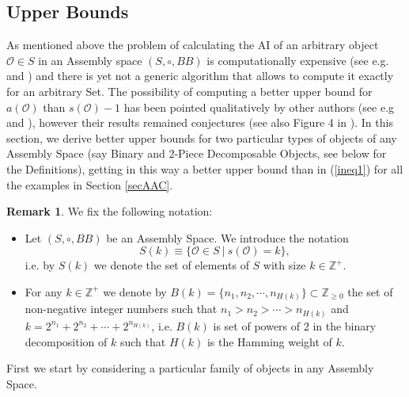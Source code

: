 \documentclass[letterpaper,12pt]{article}
\theoremstyle{definition}
\newtheorem{remark}{Remark}
\begin{document}



\subsection{Upper Bounds}

As mentioned above the problem of calculating the AI  of an arbitrary object $\mathscr{O} \in S$ in an Assembly space $(S,\circ,BB)$ is computationally expensive (see e.g. \cite{kempes2024assembly} and \cite{seet2024rapid}) and there is yet not a generic algorithm that allows to compute it exactly for an arbitrary Set. The possibility of computing a better upper bound for $a(\mathscr{O})$ than $s(\mathscr{O})-1$ has been pointed qualitatively by other authors (see e.g \cite{Marshall2022FormalisingTP} and \cite{math12101600}), however their results remained conjectures (see also Figure 4 in \cite{RSPaper}). In this section, we derive better upper bounds for two particular types of objects of any Assembly Space (say Binary and 2-Piece Decomposable Objects, see below for the Definitions), getting in this way a better upper bound than in (\ref{ineq1}) for all the examples in Section \ref{secAAC}.
\begin{remark}
    We fix the following notation: 
    \begin{itemize}
        \item Let $(S,\circ,BB)$ be an Assembly Space. We introduce the notation
\begin{equation}
    S(k) \equiv \{\mathscr{O} \in S \ | \ s(\mathscr{O})=k\},
\end{equation}
i.e. by $S(k)$ we denote the set of elements of $S$ with size $k \in \mathbb{Z}^+ $.  
\item For any $k \in \mathbb{Z}^+$ we denote by $B(k)=\{n_1,n_2,\cdots,n_{H(k)}\} \subset \mathbb{Z}_{\geq 0}$ the set of non-negative integer numbers such that $n_1>n_2>\cdots>n_{H(k)}$ and $k=2^{n_1}+2^{n_2}+\cdots+2^{n_{H(k)}}$, i.e. $B(k)$ is set of powers of 2 in the binary decomposition of $k$ such that $H(k)$ is the Hamming weight of $k$.
    \end{itemize}
\end{remark}
First we start by considering a particular family of objects in any Assembly Space. 
\end{document}
